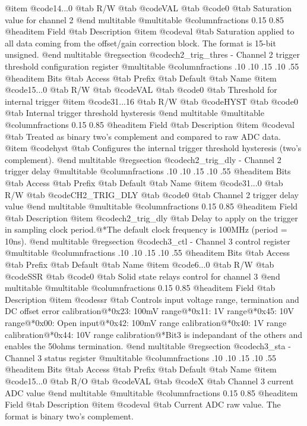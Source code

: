 @item @code{14...0}
@tab R/W @tab
@code{VAL}
@tab @code{0} @tab 
Saturation value for channel 2
@end multitable
@multitable @columnfractions 0.15 0.85
@headitem Field @tab Description
@item @code{val} @tab Saturation applied to all data coming from the offset/gain correction block. The format is 15-bit unsigned.
@end multitable
@regsection @code{ch2_trig_thres} - Channel 2 trigger threshold configuration register
@multitable @columnfractions .10 .10 .15 .10 .55
@headitem Bits @tab Access @tab Prefix @tab Default @tab Name
@item @code{15...0}
@tab R/W @tab
@code{VAL}
@tab @code{0} @tab 
Threshold for internal trigger
@item @code{31...16}
@tab R/W @tab
@code{HYST}
@tab @code{0} @tab 
Internal trigger threshold hysteresis
@end multitable
@multitable @columnfractions 0.15 0.85
@headitem Field @tab Description
@item @code{val} @tab Treated as binary two's complement and compared to raw ADC data.
@item @code{hyst} @tab Configures the internal trigger threshold hysteresis (two's complement).
@end multitable
@regsection @code{ch2_trig_dly} - Channel 2 trigger delay
@multitable @columnfractions .10 .10 .15 .10 .55
@headitem Bits @tab Access @tab Prefix @tab Default @tab Name
@item @code{31...0}
@tab R/W @tab
@code{CH2_TRIG_DLY}
@tab @code{0} @tab 
Channel 2 trigger delay value
@end multitable
@multitable @columnfractions 0.15 0.85
@headitem Field @tab Description
@item @code{ch2_trig_dly} @tab Delay to apply on the trigger in sampling clock period.@*The default clock frequency is 100MHz (period = 10ns).
@end multitable
@regsection @code{ch3_ctl} - Channel 3 control register
@multitable @columnfractions .10 .10 .15 .10 .55
@headitem Bits @tab Access @tab Prefix @tab Default @tab Name
@item @code{6...0}
@tab R/W @tab
@code{SSR}
@tab @code{0} @tab 
Solid state relays control for channel 3
@end multitable
@multitable @columnfractions 0.15 0.85
@headitem Field @tab Description
@item @code{ssr} @tab Controls input voltage range, termination and DC offset error calibration@*0x23: 100mV range@*0x11: 1V range@*0x45: 10V range@*0x00: Open input@*0x42: 100mV range calibration@*0x40: 1V range calibration@*0x44: 10V range calibration@*Bit3 is indepandant of the others and enables the 50ohms termination.
@end multitable
@regsection @code{ch3_sta} - Channel 3 status register
@multitable @columnfractions .10 .10 .15 .10 .55
@headitem Bits @tab Access @tab Prefix @tab Default @tab Name
@item @code{15...0}
@tab R/O @tab
@code{VAL}
@tab @code{X} @tab 
Channel 3 current ADC value
@end multitable
@multitable @columnfractions 0.15 0.85
@headitem Field @tab Description
@item @code{val} @tab Current ADC raw value. The format is binary two's complement.
